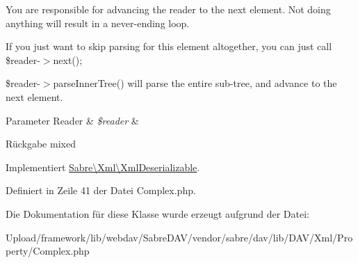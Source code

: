 You are responsible for advancing the reader to the next element. Not doing anything will result in a never-\/ending loop.

If you just want to skip parsing for this element altogether, you can just call \$reader-\/$>$next();

\$reader-\/$>$parse\+Inner\+Tree() will parse the entire sub-\/tree, and advance to the next element.


\begin{DoxyParams}[1]{Parameter}
Reader & {\em \$reader} & \\
\hline
\end{DoxyParams}
\begin{DoxyReturn}{Rückgabe}
mixed 
\end{DoxyReturn}


Implementiert \mbox{\hyperlink{interface_sabre_1_1_xml_1_1_xml_deserializable_a19e0eca545b9a0d93f7d6b69085ade30}{Sabre\textbackslash{}\+Xml\textbackslash{}\+Xml\+Deserializable}}.



Definiert in Zeile 41 der Datei Complex.\+php.



Die Dokumentation für diese Klasse wurde erzeugt aufgrund der Datei\+:\begin{DoxyCompactItemize}
\item 
Upload/framework/lib/webdav/\+Sabre\+D\+A\+V/vendor/sabre/dav/lib/\+D\+A\+V/\+Xml/\+Property/Complex.\+php\end{DoxyCompactItemize}
